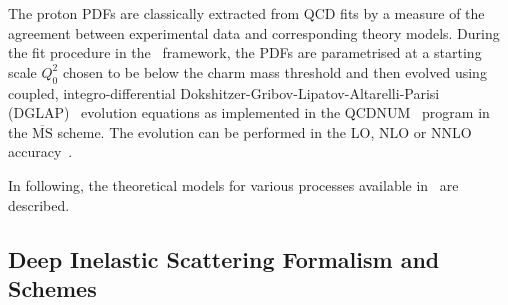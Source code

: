 
\def\kt{\ensuremath{k_t}}
\newcommand{\Pmax}{p}
\newcommand{\CCFM}{CCFMa,CCFMb,Catani:1989sg,CCFMd}


The proton PDFs are classically extracted from QCD fits by a measure of 
the agreement between experimental data and corresponding theory models.
During the fit procedure in the \fitter\ framework, the PDFs are
parametrised at a starting scale $Q^2_0$ chosen to be below the charm 
mass threshold and then evolved using coupled, integro-differential
Dokshitzer-Gribov-Lipatov-Altarelli-Parisi 
(DGLAP)~\cite{Gribov:1972ri,Gribov:1972rt,Lipatov:1974qm,
Dokshitzer:1977sg,Altarelli:1977zs} evolution equations 
as implemented in the QCDNUM~\cite{qcdnum} program in the $\overline{\text{MS}}$ scheme. 
The evolution can be performed in the LO, NLO or NNLO accuracy~\cite{Curci:1980uw,Furmanski:1980cm}.

In following, the theoretical models for various processes available in \fitter\ are described.

\subsection{Deep Inelastic Scattering Formalism and Schemes}

